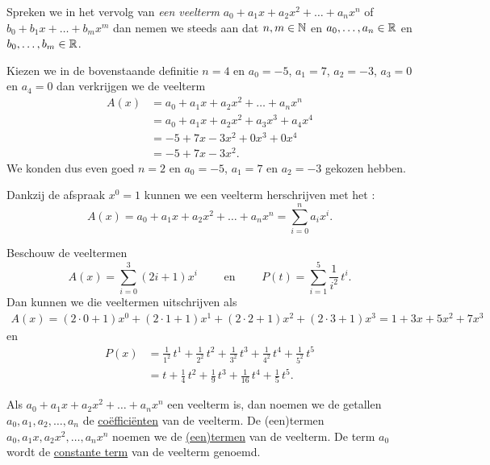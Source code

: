 \documentclass{ximera}
\begin{document}
Spreken we in het vervolg van {\em een veelterm} $a_0 + a_1x + a_2x^2 + \dots + a_n x^n$ of $b_0 + b_1x + \dots + b_m x^m$ dan nemen we steeds aan dat $n,m\in \mathbb{N}$ en $a_0, \ldots, a_n\in \mathbb{R}$ en $b_0, \ldots, b_m\in \mathbb{R}$.

\begin{example}
Kiezen we in de bovenstaande definitie $n = 4$ en $a_0 = -5$, $a_1 = 7$, $a_2 = -3$, $a_3 = 0$ en $a_4 = 0$ dan verkrijgen we de veelterm
\begin{align*}
A(x) 
& = a_0 + a_1x + a_2x^2 + \dots + a_n x^n \\
& = a_0 + a_1x + a_2x^2 + a_3 x^3 + a_4 x^4 \\ 
& = -5 + 7x - 3x^2 + 0x^3 + 0x^4 \\
& = -5 + 7x - 3x^2.
\end{align*}
We konden dus even goed $n = 2$ en $a_0 = -5$, $a_1 = 7$ en $a_2 = -3$ gekozen hebben. 
\end{example}

Dankzij de afspraak $x^0 = 1$ kunnen we een veelterm herschrijven met het :
\[
A(x) = a_0 + a_1x + a_2x^2 + \dots + a_n x^n = \sum_{i=0}^n a_i x^i.
\]

\begin{example}
Beschouw de veeltermen
\[
A(x) = \sum_{i=0}^3 (2i+1) x^i \qquad \text{ en } \qquad P(t) = \sum_{i=1}^5 \frac{1}{i^2} \, t^i.
\] 
Dan kunnen we die veeltermen uitschrijven als
\begin{align*}
A(x)  = (2\cdot0+1)x^0 + (2\cdot1+1)x^1 + (2\cdot2+1)x^2 + (2\cdot3+1)x^3 = 1 + 3x + 5x^2 + 7x^3
\end{align*}
en
\begin{align*}
P(x) 
& = \frac{1}{1^2} \, t^1 + \frac{1}{2^2} \, t^2 + \frac{1}{3^2} \, t^3 + \frac{1}{4^2} \, t^4 + \frac{1}{5^2} \, t^5 \\
& = t + \frac{1}{4}\,t^2 + \frac{1}{9}\,t^3 + \frac{1}{16}\,t^4 + \frac{1}{5}\,t^5.
\end{align*}
\end{example}

Als $a_0 + a_1x + a_2x^2 + \dots + a_n x^n$ een veelterm is, dan noemen we de getallen $a_0, a_1, a_2, \ldots, a_n$ de \underline{co\"effici\"enten} van de veelterm. De (een)termen $a_0, a_1x, a_2x^2, \ldots , a_nx^n$ noemen we de \underline{(een)termen} van de veelterm. De term $a_0$ wordt de \underline{constante term} van de veelterm genoemd.
\end{document}
